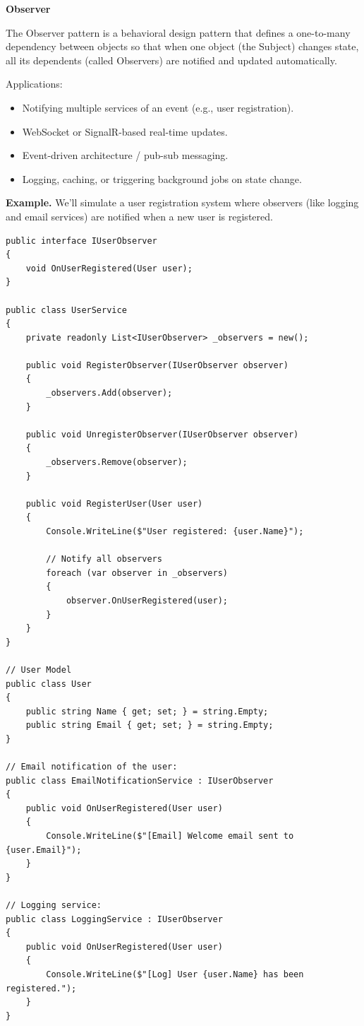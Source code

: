 \medskip
\begin{center}
\textbf{Observer}
\end{center}

The Observer pattern is a behavioral design pattern that defines a one-to-many dependency between objects so that when one object (the Subject) changes state, all its dependents (called Observers) are notified and updated automatically.

Applications:

\begin{itemize}
\item Notifying multiple services of an event (e.g., user registration).

\item WebSocket or SignalR-based real-time updates.

\item Event-driven architecture / pub-sub messaging.

\item Logging, caching, or triggering background jobs on state change.
\end{itemize}

\textbf{Example.} We'll simulate a user registration system where observers (like logging and email services) are notified when a new user is registered.

\begin{lstlisting}
public interface IUserObserver
{
    void OnUserRegistered(User user);
}

public class UserService
{
    private readonly List<IUserObserver> _observers = new();

    public void RegisterObserver(IUserObserver observer)
    {
        _observers.Add(observer);
    }

    public void UnregisterObserver(IUserObserver observer)
    {
        _observers.Remove(observer);
    }

    public void RegisterUser(User user)
    {
        Console.WriteLine($"User registered: {user.Name}");

        // Notify all observers
        foreach (var observer in _observers)
        {
            observer.OnUserRegistered(user);
        }
    }
}

// User Model
public class User
{
    public string Name { get; set; } = string.Empty;
    public string Email { get; set; } = string.Empty;
}

// Email notification of the user:
public class EmailNotificationService : IUserObserver
{
    public void OnUserRegistered(User user)
    {
        Console.WriteLine($"[Email] Welcome email sent to {user.Email}");
    }
}

// Logging service:
public class LoggingService : IUserObserver
{
    public void OnUserRegistered(User user)
    {
        Console.WriteLine($"[Log] User {user.Name} has been registered.");
    }
}
\end{lstlisting}







